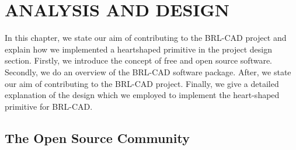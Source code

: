 
\chapter{ANALYSIS AND DESIGN} %

\label{Analysis And Design} %



\hspace{30} In this chapter,   we   state   our   aim   of   contributing   to   the   BRL-­CAD   project  
and   explain   how   we   implemented   a   heart­shaped   primitive   in   the   project   design  
section.   Firstly,   we   introduce   the   concept   of   free   and   open   source   software. Secondly,   we   do   an   overview   of   the   BRL-­CAD   software   package.   After,   we  state   our   aim   of   contributing   to   the   BRL-­CAD   project.   Finally,   we   give   a   detailed  explanation   of   the   design   which   we   employed   to   implement   the   heart-­shaped primitive for BRL-­CAD.

\section{The Open Source Community}

